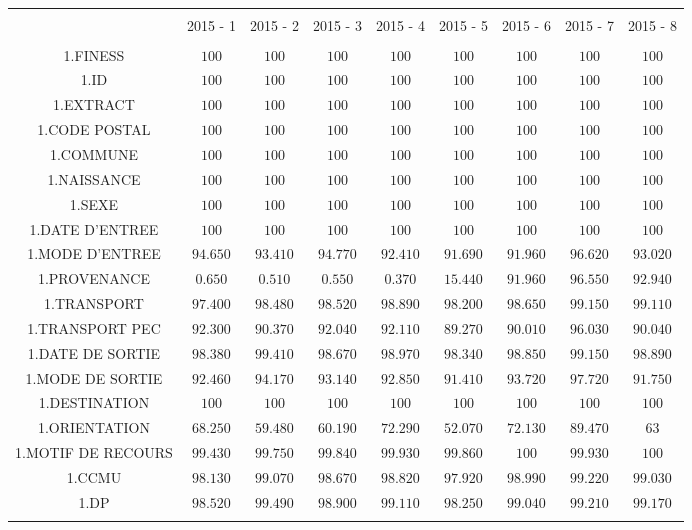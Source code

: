 \documentclass[]{article}
\begin{document}
\begin{table}[!htbp] \centering 
  \caption{} 
  \label{} 
\begin{tabular}{@{\extracolsep{5pt}} ccccccccc} 
\\[-1.8ex]\hline 
\hline \\[-1.8ex] 
 & 2015 - 1 & 2015 - 2 & 2015 - 3 & 2015 - 4 & 2015 - 5 & 2015 - 6 & 2015 - 7 & 2015 - 8 \\ 
\hline \\[-1.8ex] 
1.FINESS & $100$ & $100$ & $100$ & $100$ & $100$ & $100$ & $100$ & $100$ \\ 
1.ID & $100$ & $100$ & $100$ & $100$ & $100$ & $100$ & $100$ & $100$ \\ 
1.EXTRACT & $100$ & $100$ & $100$ & $100$ & $100$ & $100$ & $100$ & $100$ \\ 
1.CODE POSTAL & $100$ & $100$ & $100$ & $100$ & $100$ & $100$ & $100$ & $100$ \\ 
1.COMMUNE & $100$ & $100$ & $100$ & $100$ & $100$ & $100$ & $100$ & $100$ \\ 
1.NAISSANCE & $100$ & $100$ & $100$ & $100$ & $100$ & $100$ & $100$ & $100$ \\ 
1.SEXE & $100$ & $100$ & $100$ & $100$ & $100$ & $100$ & $100$ & $100$ \\ 
1.DATE D'ENTREE & $100$ & $100$ & $100$ & $100$ & $100$ & $100$ & $100$ & $100$ \\ 
1.MODE D'ENTREE & $94.650$ & $93.410$ & $94.770$ & $92.410$ & $91.690$ & $91.960$ & $96.620$ & $93.020$ \\ 
1.PROVENANCE & $0.650$ & $0.510$ & $0.550$ & $0.370$ & $15.440$ & $91.960$ & $96.550$ & $92.940$ \\ 
1.TRANSPORT & $97.400$ & $98.480$ & $98.520$ & $98.890$ & $98.200$ & $98.650$ & $99.150$ & $99.110$ \\ 
1.TRANSPORT PEC & $92.300$ & $90.370$ & $92.040$ & $92.110$ & $89.270$ & $90.010$ & $96.030$ & $90.040$ \\ 
1.DATE DE SORTIE & $98.380$ & $99.410$ & $98.670$ & $98.970$ & $98.340$ & $98.850$ & $99.150$ & $98.890$ \\ 
1.MODE DE SORTIE & $92.460$ & $94.170$ & $93.140$ & $92.850$ & $91.410$ & $93.720$ & $97.720$ & $91.750$ \\ 
1.DESTINATION & $100$ & $100$ & $100$ & $100$ & $100$ & $100$ & $100$ & $100$ \\ 
1.ORIENTATION & $68.250$ & $59.480$ & $60.190$ & $72.290$ & $52.070$ & $72.130$ & $89.470$ & $63$ \\ 
1.MOTIF DE RECOURS & $99.430$ & $99.750$ & $99.840$ & $99.930$ & $99.860$ & $100$ & $99.930$ & $100$ \\ 
1.CCMU & $98.130$ & $99.070$ & $98.670$ & $98.820$ & $97.920$ & $98.990$ & $99.220$ & $99.030$ \\ 
1.DP & $98.520$ & $99.490$ & $98.900$ & $99.110$ & $98.250$ & $99.040$ & $99.210$ & $99.170$ \\ 
\hline \\[-1.8ex] 
\end{tabular} 
\end{table}
\end{document}
